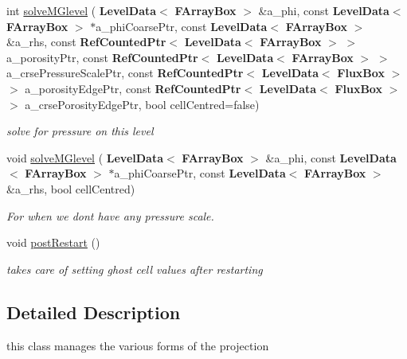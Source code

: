 \begin{DoxyCompactItemize}
\mbox{\label{class_projector_ab7d28a7696b51dca78d0b73f36ad0809}} 
int \hyperlink{class_projector_ab7d28a7696b51dca78d0b73f36ad0809}{solve\+M\+Glevel} (\textbf{ Level\+Data}$<$ \textbf{ F\+Array\+Box} $>$ \&a\+\_\+phi, const \textbf{ Level\+Data}$<$ \textbf{ F\+Array\+Box} $>$ $\ast$a\+\_\+phi\+Coarse\+Ptr, const \textbf{ Level\+Data}$<$ \textbf{ F\+Array\+Box} $>$ \&a\+\_\+rhs, const \textbf{ Ref\+Counted\+Ptr}$<$ \textbf{ Level\+Data}$<$ \textbf{ F\+Array\+Box} $>$ $>$ a\+\_\+porosity\+Ptr, const \textbf{ Ref\+Counted\+Ptr}$<$ \textbf{ Level\+Data}$<$ \textbf{ F\+Array\+Box} $>$ $>$ a\+\_\+crse\+Pressure\+Scale\+Ptr, const \textbf{ Ref\+Counted\+Ptr}$<$ \textbf{ Level\+Data}$<$ \textbf{ Flux\+Box} $>$ $>$ a\+\_\+porosity\+Edge\+Ptr, const \textbf{ Ref\+Counted\+Ptr}$<$ \textbf{ Level\+Data}$<$ \textbf{ Flux\+Box} $>$ $>$ a\+\_\+crse\+Porosity\+Edge\+Ptr, bool cell\+Centred=false)
\begin{DoxyCompactList}\small\item\em solve for pressure on this level \end{DoxyCompactList}\item 
\mbox{\label{class_projector_a0156fbb319d6f21b8ee5341e1731972a}} 
void \hyperlink{class_projector_a0156fbb319d6f21b8ee5341e1731972a}{solve\+M\+Glevel} (\textbf{ Level\+Data}$<$ \textbf{ F\+Array\+Box} $>$ \&a\+\_\+phi, const \textbf{ Level\+Data}$<$ \textbf{ F\+Array\+Box} $>$ $\ast$a\+\_\+phi\+Coarse\+Ptr, const \textbf{ Level\+Data}$<$ \textbf{ F\+Array\+Box} $>$ \&a\+\_\+rhs, bool cell\+Centred)
\begin{DoxyCompactList}\small\item\em For when we don\textquotesingle{}t have any pressure scale. \end{DoxyCompactList}\item 
\mbox{\label{class_projector_a0118bdf045f4e250e039ed976601fe60}} 
void \hyperlink{class_projector_a0118bdf045f4e250e039ed976601fe60}{post\+Restart} ()
\begin{DoxyCompactList}\small\item\em takes care of setting ghost cell values after restarting \end{DoxyCompactList}\end{DoxyCompactItemize}


\subsection{Detailed Description}
this class manages the various forms of the projection 

